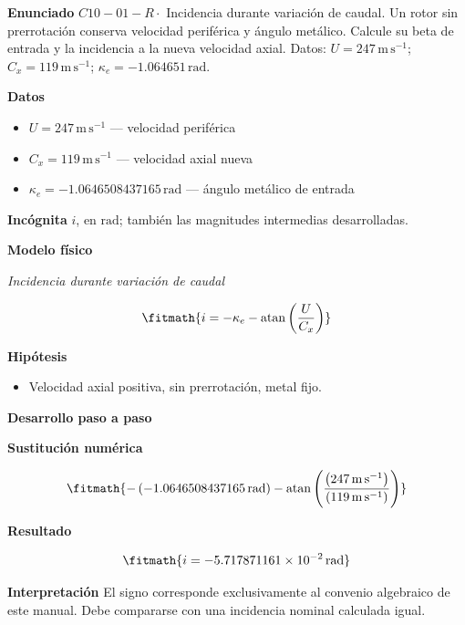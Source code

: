 \documentclass[10pt,openany]{book}
\begin{document}
\begin{tcolorbox}[title={Problema resuelto 1}, studiumworked, breakable]

\noindent\textbf{Enunciado}
\(C10-01-R \cdot\) Incidencia durante variación de caudal. Un rotor sin prerrotación conserva velocidad periférica y ángulo metálico. Calcule su beta de entrada y la incidencia a la nueva velocidad axial. Datos: \(U=247\, \mathrm{m}\,\mathrm{s}^{-1}\); \(C_x=119\, \mathrm{m}\,\mathrm{s}^{-1}\); \(\kappa_e=-1.064651\, \mathrm{rad}\).

\noindent\textbf{Datos}
\begin{itemize}
\item $U = 247\,\mathrm{m}\,\mathrm{s}^{-1}$ — velocidad periférica
\item $C_x = 119\,\mathrm{m}\,\mathrm{s}^{-1}$ — velocidad axial nueva
\item $\kappa_e = -1.0646508437165\,\mathrm{rad}$ — ángulo metálico de entrada
\end{itemize}

\noindent\textbf{Incógnita}
$i$, en $\mathrm{rad}$; también las magnitudes intermedias desarrolladas.

\noindent\textbf{Modelo físico}

\noindent\textit{Incidencia durante variación de caudal}

\[
\fitmath{i=- \kappa_e - \operatorname{atan}{\left(\frac{U}{C_x} \right)}}
\]

\noindent\textbf{Hipótesis}
\begin{itemize}
\item Velocidad axial positiva, sin prerrotación, metal fijo.
\end{itemize}

\noindent\textbf{Desarrollo paso a paso}



\noindent\textbf{Sustitución numérica}

\[
\fitmath{- \left(-1.0646508437165\,\mathrm{rad}\right) - \operatorname{atan}{\left(\frac{\left(247\,\mathrm{m}\,\mathrm{s}^{-1}\right)}{\left(119\,\mathrm{m}\,\mathrm{s}^{-1}\right)} \right)}}
\]

\noindent\textbf{Resultado}

\[
\fitmath{i=-5.717871161\times10^{-2}\,\mathrm{rad}}
\]

\noindent\textbf{Interpretación}
El signo corresponde exclusivamente al convenio algebraico de este manual. Debe compararse con una incidencia nominal calculada igual.


\end{tcolorbox}
\end{document}
